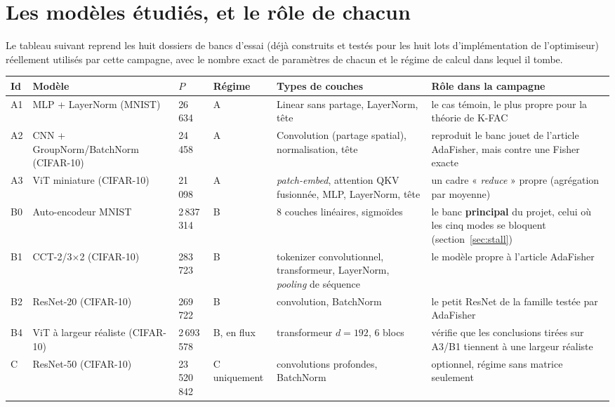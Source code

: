 \documentclass[11pt,a4paper]{article}
\newcommand{\eng}[1]{\emph{#1}}
\begin{document}
\section{Les modèles étudiés, et le rôle de chacun}

Le tableau suivant reprend les huit dossiers de bancs d'essai (déjà construits et testés pour les
huit lots d'implémentation de l'optimiseur) réellement utilisés par cette campagne, avec le nombre
exact de paramètres de chacun et le régime de calcul dans lequel il tombe.

\begin{center}
\small
\begin{tabular}{@{}p{0.8cm}p{2.6cm}p{1.4cm}p{1.1cm}p{4.3cm}p{4.5cm}@{}}
\toprule
Id & Modèle & $P$ & Régime & Types de couches & Rôle dans la campagne \\
\midrule
A1 & MLP + LayerNorm (MNIST) & 26\,634 & A & Linear sans partage, LayerNorm, tête & le cas témoin, le plus propre pour la théorie de K-FAC \\
A2 & CNN + GroupNorm/BatchNorm (CIFAR-10) & 24\,458 & A & Convolution (partage spatial), normalisation, tête & reproduit le banc jouet de l'article AdaFisher, mais contre une Fisher exacte \\
A3 & ViT miniature (CIFAR-10) & 21\,098 & A & \eng{patch-embed}, attention QKV fusionnée, MLP, LayerNorm, tête & un cadre « \eng{reduce} » propre (agrégation par moyenne) \\
B0 & Auto-encodeur MNIST & 2\,837\,314 & B & 8 couches linéaires, sigmoïdes & le banc \textbf{principal} du projet, celui où les cinq modes se bloquent (section~\ref{sec:stall}) \\
B1 & CCT-2/3$\times$2 (CIFAR-10) & 283\,723 & B & tokenizer convolutionnel, transformeur, LayerNorm, \eng{pooling} de séquence & le modèle propre à l'article AdaFisher \\
B2 & ResNet-20 (CIFAR-10) & 269\,722 & B & convolution, BatchNorm & le petit ResNet de la famille testée par AdaFisher \\
B4 & ViT à largeur réaliste (CIFAR-10) & 2\,693\,578 & B, en flux & transformeur $d=192$, 6 blocs & vérifie que les conclusions tirées sur A3/B1 tiennent à une largeur réaliste \\
C & ResNet-50 (CIFAR-10) & 23\,520\,842 & C uniquement & convolutions profondes, BatchNorm & optionnel, régime sans matrice seulement \\
\bottomrule
\end{tabular}
\end{center}
\end{document}
